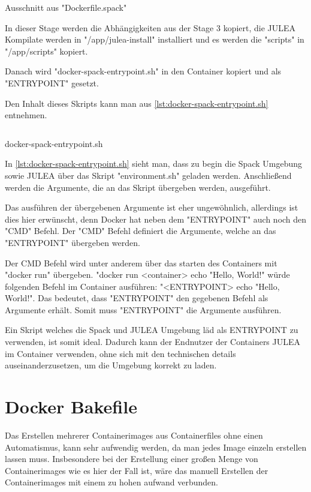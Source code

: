 \begin{listing}[H]
\inputminted[firstline=42,lastline=48]{dockerfile}{./code-examples/Dockerfile.spack}
\caption{Ausschnitt aus "Dockerfile.spack"}
\end{listing}


In dieser Stage werden die Abhängigkeiten aus der Stage 3 kopiert, die JULEA Kompilate werden in "/app/julea-install" installiert und es werden die "scripts" in "/app/scripts" kopiert.

Danach wird "docker-spack-entrypoint.sh" in den Container kopiert und als "ENTRYPOINT" gesetzt. 

Den Inhalt dieses Skripts kann man aus \cref{lst:docker-spack-entrypoint.sh} entnehmen.

\begin{listing}[H]
    \inputminted{bash}{./code-examples/docker-spack-entrypoint.sh}
    \caption{docker-spack-entrypoint.sh}
    \label{lst:docker-spack-entrypoint.sh}
\end{listing}

In \cref{lst:docker-spack-entrypoint.sh} sieht man, dass zu begin die Spack Umgebung sowie JULEA über das Skript "environment.sh" geladen werden.
Anschließend werden die Argumente, die an das Skript übergeben werden, ausgeführt.

Das ausführen der übergebenen Argumente ist eher ungewöhnlich, allerdings ist dies hier erwünscht, denn Docker hat neben dem "ENTRYPOINT" auch noch den "CMD" Befehl. Der "CMD" Befehl definiert die Argumente, welche an das "ENTRYPOINT" übergeben werden. 

Der CMD Befehl wird unter anderem über das starten des Containers mit "docker run" übergeben. "docker run <container> echo "Hello, World!" würde folgenden Befehl im Container ausführen: "<ENTRYPOINT> echo "Hello, World!". Das bedeutet, dass "ENTRYPOINT" den gegebenen Befehl als Argumente erhält. Somit muss "ENTRYPOINT" die Argumente ausführen.

Ein Skript welches die Spack und JULEA Umgebung läd als ENTRYPOINT zu verwenden, ist somit ideal. Dadurch kann der Endnutzer der Containers JULEA im Container verwenden, ohne sich mit den technischen details auseinanderzusetzen, um die Umgebung korrekt zu laden.

\section{Docker Bakefile}

Das Erstellen mehrerer Containerimages aus Containerfiles ohne einen Automatismus, kann sehr aufwendig werden, da man jedes Image einzeln erstellen lassen muss. Insbesondere bei der Erstellung einer großen Menge von Containerimages wie es hier der Fall ist, wäre das manuell Erstellen der Containerimages mit einem zu hohen aufwand verbunden. 

